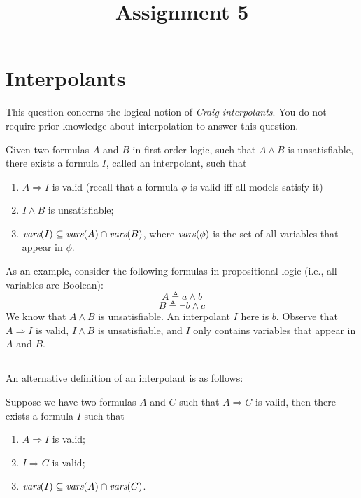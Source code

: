 \documentclass[11pt, oneside]{article}   	%
\title{Assignment 5}
\begin{document}
\maketitle

\section{Interpolants}

This question concerns the logical notion
of \emph{Craig interpolants}.
You do not require prior knowledge about interpolation
to answer this question.

Given two formulas $A$ and $B$ in first-order logic,
such that $A \land B$ is unsatisfiable,
there exists a formula $I$, called an interpolant, such that
\begin{enumerate}
    \item $A \Rightarrow I$ is valid (recall that a formula $\phi$ is valid iff all models satisfy it)
    \item $I \land B$ is unsatisfiable;
    \item $\emph{vars}(I) \subseteq \emph{vars}(A) \cap \emph{vars}(B)$,
        where $\emph{vars}(\phi)$ is the set of all variables
        that appear in $\phi$.
\end{enumerate}

As an example, consider the following formulas
in propositional logic (i.e., all variables are Boolean):
%
$$A \triangleq a \land b$$
$$B \triangleq \neg b \land c$$
%
We know that $A \land B$ is unsatisfiable.
An interpolant $I$ here is $b$. Observe that
$A \Rightarrow I$ is valid, $I \land  B$ is unsatisfiable,
and $I$ only contains variables that appear in $A$ and $B$.


\subsection{}
An alternative definition of an interpolant
is as follows:

Suppose we have two formulas $A$ and $C$
such that $A \Rightarrow C$ is valid, then
there exists a formula $I$ such that
\begin{enumerate}
    \item $A \Rightarrow I$ is valid;
    \item $I \Rightarrow C$ is valid;
    \item $\emph{vars}(I) \subseteq \emph{vars}(A) \cap \emph{vars}(C)$.
\end{enumerate}
\end{document}
